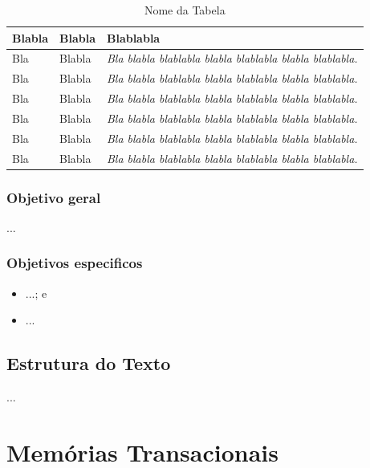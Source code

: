 \documentclass[diss,capa]{texufpel}
\begin{document}
\begin{table}
  \begin{center}
    \caption{Nome da Tabela}\label{tabela}
    \begin{tabular}{p{4cm}p{5cm}p{6cm}}
      \hline
      Blabla & Blabla & Blablabla\\
      \hline
      {\small Bla} & {\small Blabla} & {\small\em Bla blabla blablabla blabla
        blablabla blabla blablabla.}\\
      {\small Bla} & {\small Blabla} & {\small\em Bla blabla blablabla blabla
        blablabla blabla blablabla.}\\
      {\small Bla} & {\small Blabla} & {\small\em Bla blabla blablabla blabla
        blablabla blabla blablabla.}\\
      {\small Bla} & {\small Blabla} & {\small\em Bla blabla blablabla blabla
        blablabla blabla blablabla.}\\
      {\small Bla} & {\small Blabla} & {\small\em Bla blabla blablabla blabla
        blablabla blabla blablabla.}\\
      {\small Bla} & {\small Blabla} & {\small\em Bla blabla blablabla blabla
        blablabla blabla blablabla.}\\
      \hline
    \end{tabular}
  \end{center}
\end{table}

\subsection{Objetivo geral}

...

\subsection{Objetivos especificos}

\begin{itemize}

  \item ...; e
  \item ...
\end{itemize}

\section{Estrutura do Texto}

...

\chapter{Memórias Transacionais}
\label{chapter::stm}
\end{document}
